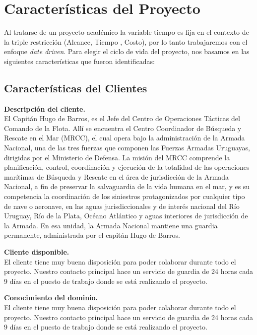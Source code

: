 \section{Características del Proyecto}\label{sec:caracteristicasDelProyecto}

Al tratarse de un proyecto académico la variable tiempo es fija en el contexto de la triple restricción (Alcance, Tiempo , Costo), 
por lo tanto trabajaremos con el enfoque \textit{date driven}. Para elegir el ciclo de vida del proyecto, nos basamos en las siguientes características 
que fueron identificadas:

\subsection{Características del Clientes} 
\textbf{Descripción del cliente.}\\
El Capitán Hugo de Barros, es el Jefe del Centro de Operaciones Tácticas del Comando de la Flota. 
Allí se encuentra el Centro Coordinador de Búsqueda y Rescate en el Mar (MRCC), el cual opera bajo la administración de la Armada Nacional, 
una de las tres fuerzas que componen las Fuerzas Armadas Uruguayas, dirigidas por el Ministerio de Defensa. 
La misión del MRCC comprende la planificación, control, coordinación y ejecución de la totalidad de las operaciones marítimas de Búsqueda y 
Rescate en el área de jurisdicción de la Armada Nacional, a fin de preservar la salvaguardia de la vida humana en el mar, y es su competencia 
la coordinación de los siniestros protagonizados por cualquier tipo de nave o aeronave, en las aguas jurisdiccionales y de interés nacional del 
Río Uruguay, Río de la Plata, Océano Atlántico y aguas interiores de jurisdicción de la Armada.
En esa unidad, la Armada Nacional mantiene una guardia permanente, administrada por el capitán Hugo de Barros. 

\textbf{Cliente disponible.}\\
El cliente tiene muy buena disposición para poder colaborar durante todo el proyecto. Nuestro contacto principal hace un 
servicio de guardia de 24 horas cada 9 días en el puesto de trabajo donde se está realizando el proyecto.

\textbf{Conocimiento del dominio.}\\
El cliente tiene muy buena disposición para poder colaborar durante todo el proyecto. Nuestro contacto principal hace un 
servicio de guardia de 24 horas cada 9 días en el puesto de trabajo donde se está realizando el proyecto.



